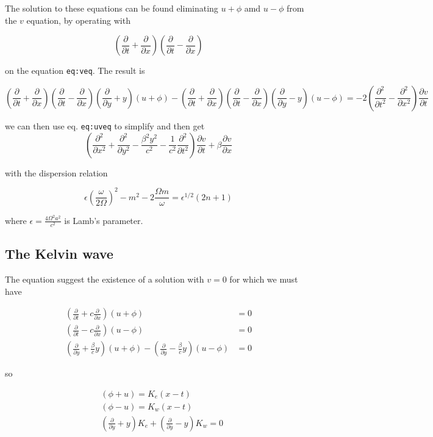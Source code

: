 The solution to these equations can be found eliminating \(u+\phi\) amd
\(u-\phi\) from the \(v\) equation, by operating with

\[(\frac{\partial }{\partial t}+\frac{\partial }{\partial x})(\frac{\partial }{\partial t}-\frac{\partial }{\partial x})\]

on the equation \texttt{eq:veq}. The result is

\[
(\frac{\partial }{\partial t}+\frac{\partial }{\partial x})(\frac{\partial }{\partial t}-\frac{\partial }{\partial x}) \left( \frac{\partial }{\partial y} +y \right) (u+\phi) - (\frac{\partial }{\partial t}+\frac{\partial }{\partial x})(\frac{\partial }{\partial t}-\frac{\partial }{\partial x})\left(\frac{\partial }{\partial y} -y\right)(u-\phi) = -2(\frac{\partial^{2} }{\partial t^{2}}-\frac{\partial^{2} }{\partial x^{2}}) \frac{\partial v}{\partial t}
\]

we can then use eq. \texttt{eq:uveq} to simplify and then get
\[
\left( \frac{\partial^{2} }{\partial x^{2}} + \frac{\partial^{2} }{\partial y^{2}} -\frac{\beta^2y^2}{c^2} -\frac{1}{c^2}\frac{\partial^{2} }{\partial t^{2}} \right)\frac{\partial v}{\partial t} + \beta \frac{\partial v}{\partial x}
\]

with the dispersion relation

\[\epsilon\left(\frac{\omega}{2\Omega}\right)^2 -m^2 - 2\frac{\Omega m}{\omega} = \epsilon^{1/2}(2 n + 1)\]

where \(\epsilon = \frac{4\Omega^2a^2}{c^2}\) is Lamb's parameter.

\subsection{The Kelvin wave}\label{the-kelvin-wave}

The equation suggest the existence of a solution with \(v=0\) for which
we must have

\[\begin{aligned}
(\frac{\partial }{\partial t}+c \frac{\partial }{\partial x})(u+\phi) &= 0  \\
(\frac{\partial }{\partial t}-c \frac{\partial }{\partial x})(u-\phi) &=  0  \\
\left( \frac{\partial }{\partial y}+ \frac{\beta}{c}y \right)(u+\phi) -\left( \frac{\partial }{\partial y}- \frac{\beta}{c}y \right)(u-\phi)&=0
\end{aligned}\]

so

\[\begin{aligned}
&(\phi+ u) = K_e(x - t)  \\
&(\phi- u) =  K_w(x- t)  \\
& \left( \frac{\partial }{\partial y}+  y \right)K_e+\left( \frac{\partial }{\partial y}-  y \right)K_w=0
\end{aligned}\]

